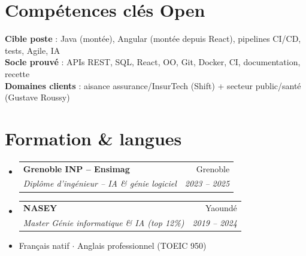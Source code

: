 \documentclass[a4paper,10.5pt]{article}
\makeatletter
\newcommand{\resumeSubheading}[4]{\vspace{3pt}\item\begin{tabular*}{0.97\textwidth}[t]{l@{\extracolsep{\fill}}r}\textbf{#1}&{#2}\\\textit{\small #3}&\textit{\small #4}\\\end{tabular*}\vspace{1pt}}
\newcommand{\resumeSubHeadingListStart}{\begin{itemize}[leftmargin=0.08in,label={}]}
\newcommand{\resumeSubHeadingListEnd}{\end{itemize}}
\makeatother
\begin{document}
\section{Comp\'etences cl\'es Open}
\begin{itemize}[leftmargin=0.08in,label={}]\small{\item{
\textbf{Cible poste} : Java (mont\'ee), Angular (mont\'ee depuis React), pipelines CI/CD, tests, Agile, IA \\
\textbf{Socle prouv\'e} : APIs REST, SQL, React, OO, Git, Docker, CI, documentation, recette \\
\textbf{Domaines clients} : aisance assurance/InsurTech (Shift) + secteur public/sant\'e (Gustave Roussy)
}}\end{itemize}

\section{Formation \& langues}
\resumeSubHeadingListStart
  \resumeSubheading{Grenoble INP -- Ensimag}{Grenoble}{Dipl\^ome d'ing\'enieur -- IA \& g\'enie logiciel}{2023 -- 2025}
  \resumeSubheading{NASEY}{Yaound\'e}{Master G\'enie informatique \& IA (top 12\%)}{2019 -- 2024}
\resumeSubHeadingListEnd
\begin{itemize}[leftmargin=0.08in,label={}]\item Fran\c{c}ais natif $\cdot$ Anglais professionnel (TOEIC 950)\end{itemize}
\end{document}

